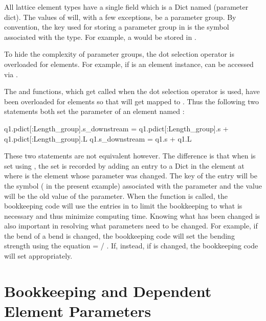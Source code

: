 All lattice element types have a single field which is a Dict named  (parameter dict). 
The values of  will, with a few exceptions, be a parameter group.
By convention, the key used for storing a parameter group in  is the symbol associated with the type. For example, a  would be stored in .

To hide the complexity of parameter groups, the dot selection operator is overloaded for elements.
For example, if  is an element instance,  can be accessed
via .

The  and  functions, which get called when the dot
selection operator is used, have been overloaded for elements so that  will get mapped to 
. Thus the following two statements both set the 
parameter of an element named :
\begin{example}
  q1.pdict[:Length_group].s_downstream = q1.pdict[:Length_group].s + 
                                                     q1.pdict[:Length_group].L
  q1.s_downstream = q1.s + q1.L
\end{example}
These two statements are not equivalent however. The difference is that when 
is set using , the set is recorded by adding an entry to a 
Dict in the element at  where  is the element whose parameter
was changed. The key of the entry will be the symbol ( in the present example)
associated with the parameter and the value will be the old value of the parameter. When
the  function is called, the bookkeeping code will use the
entries in  to limit the bookkeeping to what is necessary and thus
minimize computing time. Knowing what has been changed is also important in resolving what
parameters need to be changed. 
For example, if the bend  of a bend is changed, the bookkeeping code will set the 
bending strength  using the equation  =  / . If, instead, if
 is changed, the bookkeeping code will set  appropriately. 



\section{Bookkeeping and Dependent Element Parameters}
\label{s:param.depend}


